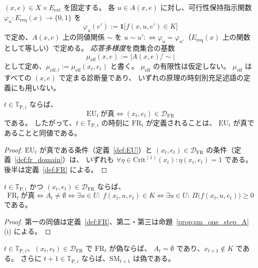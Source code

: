\begin{definition}
\label{def:mu_eff}
$(x,e)\in X\times E_{\mathrm{ext}}$ を固定する。
各 $u\in A(x,e)$ に対し、可行性保持指示関数
$\varphi_u:E_{\mathrm{req}}(x)\to\{0,1\}$ を
\[
  \varphi_u(e'):=\mathbf{1}\bigl[f(x,u,e')\in K\bigr]
\]
で定め、$A(x,e)$ 上の同値関係 $\sim$ を
$u\sim u' :\Longleftrightarrow \varphi_u=\varphi_{u'}$（$E_{\mathrm{req}}(x)$ 上の関数として等しい）で定める。
\emph{応答多様度}を商集合の基数
\[
  \mu_{\mathrm{eff}}(x,e):=\bigl|A(x,e)/\!\sim\bigr|
\]
として定め、$\mu_{\mathrm{eff},t}:=\mu_{\mathrm{eff}}(x_t,e_t)$ と書く。
$\mu_{\mathrm{eff}}$ の有限性は仮定しない。
$\mu_{\mathrm{eff}}$ はすべての $(x,e)$ で定まる診断量であり、
いずれの原理の時刻別充足述語の定義にも用いない。
\end{definition}

\begin{proposition}
\label{prop:fr_domain_eu}
$t\in\mathbb{T}_{\mathrm{P},i}$ ならば、
\[
  \mathrm{EU}_t\ \text{が真}
  \iff
  (x_t,e_t)\in\mathcal{D}_{\mathrm{FR}}
\]
である。
したがって、$t\in\mathbb{T}_{\mathrm{P},i}$ の時刻に $\mathrm{FR}_t$ が定義されることは、
$\mathrm{EU}_t$ が真であることと同値である。
\end{proposition}

\begin{proof}
$\mathrm{EU}_t$ が真である条件（定義~\ref{def:EU}）と
$(x_t,e_t)\in\mathcal{D}_{\mathrm{FR}}$ の条件（定義~\ref{def:fr_domain}）は、
いずれも $\forall\eta\in\mathrm{Crit}^{(1)}(x_t):\eta(x_t,e_t)=1$ である。
後半は定義~\ref{def:FR} による。
\end{proof}

\begin{proposition}
\label{prop:fr_one_step}
$t\in\mathbb{T}_{\mathrm{P},i}$ かつ $(x_t,e_t)\in\mathcal{D}_{\mathrm{FR}}$ ならば、
\[
  \mathrm{FR}_t\ \text{が真}
  \iff
  A_t\neq\emptyset
  \iff
  \exists u\in U:\ f(x_t,u,e_t)\in K
  \iff
  \exists u\in U:\ \Pi\bigl(f(x_t,u,e_t)\bigr)\ge0
\]
である。
\end{proposition}

\begin{proof}
第一の同値は定義~\ref{def:FR}、第二・第三は命題~\ref{prop:sm_one_step_A} (i) による。
\end{proof}

\begin{proposition}[局所 FR の偽と次時刻の状態]
\label{prop:fr_next_sm}
$t\in\mathbb{T}_{\mathrm{P},i}$、$(x_t,e_t)\in\mathcal{D}_{\mathrm{FR}}$ で $\mathrm{FR}_t$ が偽ならば、
$A_t=\emptyset$ であり、$x_{t+1}\notin K$ である。
さらに $t+1\in\mathbb{T}_{\mathrm{P},i}$ ならば、$\mathrm{SM}_{t+1}$ は偽である。
\end{proposition}

